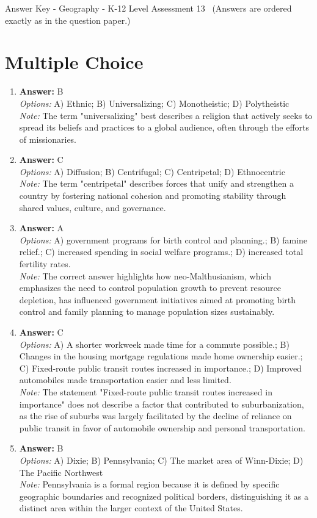 \documentclass[12pt]{article}
\begin{document}
\begin{center}
Answer Key - Geography - K-12 Level Assessment 13 \
\small (Answers are ordered exactly as in the question paper.)
\end{center}

\section*{Multiple Choice}
\begin{enumerate}[label=\arabic*.]
\item \textbf{Answer:} B
\\ \textit{Options:} A) Ethnic; B) Universalizing; C) Monotheistic; D) Polytheistic
\\ \textit{Note:} The term "universalizing" best describes a religion that actively seeks to spread its beliefs and practices to a global audience, often through the efforts of missionaries.
\item \textbf{Answer:} C
\\ \textit{Options:} A) Diffusion; B) Centrifugal; C) Centripetal; D) Ethnocentric
\\ \textit{Note:} The term "centripetal" describes forces that unify and strengthen a country by fostering national cohesion and promoting stability through shared values, culture, and governance.
\item \textbf{Answer:} A
\\ \textit{Options:} A) government programs for birth control and planning.; B) famine relief.; C) increased spending in social welfare programs.; D) increased total fertility rates.
\\ \textit{Note:} The correct answer highlights how neo-Malthusianism, which emphasizes the need to control population growth to prevent resource depletion, has influenced government initiatives aimed at promoting birth control and family planning to manage population sizes sustainably.
\item \textbf{Answer:} C
\\ \textit{Options:} A) A shorter workweek made time for a commute possible.; B) Changes in the housing mortgage regulations made home ownership easier.; C) Fixed-route public transit routes increased in importance.; D) Improved automobiles made transportation easier and less limited.
\\ \textit{Note:} The statement "Fixed-route public transit routes increased in importance" does not describe a factor that contributed to suburbanization, as the rise of suburbs was largely facilitated by the decline of reliance on public transit in favor of automobile ownership and personal transportation.
\item \textbf{Answer:} B
\\ \textit{Options:} A) Dixie; B) Pennsylvania; C) The market area of Winn-Dixie; D) The Pacific Northwest
\\ \textit{Note:} Pennsylvania is a formal region because it is defined by specific geographic boundaries and recognized political borders, distinguishing it as a distinct area within the larger context of the United States.
\end{enumerate}
\end{document}
